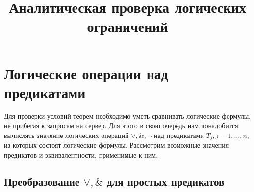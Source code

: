 \documentclass[10pt,a4paper]{article}
\title{Аналитическая проверка логических ограничений}
\begin{document}
\maketitle

\section{Логические операции над предикатами}
Для проверки условий теорем необходимо уметь сравнивать логические формулы, не прибегая к запросам
на сервер. Для этого в свою очередь нам понадобится вычислять значение логических операций $\vee,
\&, \neg$ над предикатами $T_j, j=1, \dots, n$, из которых состоят логические формулы. Рассмотрим
возможные значения предикатов и эквивалентности, применимые к ним.

\subsection{Преобразование $\vee,\&$ для простых предикатов}
\end{document}
